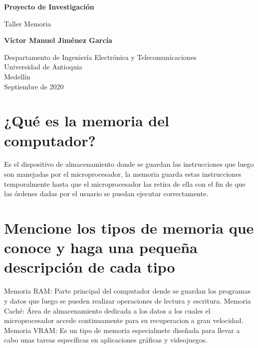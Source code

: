 \documentclass{article}
\begin{document}
\begin{titlepage}
    \begin{center}
        \vspace*{1cm}
            
        \Huge
        \textbf{Proyecto de Investigación}
            
        \vspace{0.5cm}
        \LARGE
        Taller Memoria
            
        \vspace{1.5cm}
            
        \textbf{Víctor Manuel Jiménez García}
            
        \vfill
            
        \vspace{0.8cm}
            
        \Large
        Despartamento de Ingeniería Electrónica y Telecomunicaciones\\
        Universidad de Antioquia\\
        Medellín\\
        Septiembre de 2020
            
    \end{center}
\end{titlepage}

\tableofcontents

\section{¿Qué es la memoria del computador?}
Es el dispositivo de almacenamiento donde se guardan las instrucciones que luego son manejadas por el microprocesador, la memoria guarda estas instrucciones temporalmente hasta que el microprocesador las retira de ella con el fin de que las órdenes dadas por el usuario se puedan ejecutar correctamente.

\section{Mencione los tipos de memoria que conoce y haga una pequeña descripción de cada tipo} \label{contenido}
Memoria RAM: Parte principal del computador dende se guardan los programas y datos que luego se pueden realizar operaciones de lectura y escritura.
Memoria Caché: Área de almacenamiento dedicada a los datos a los cuales el microprocesador accede continuamente para su recuperacion a gran velocidad.
Memoria VRAM: Es un tipo de memoria especialmete diseñada para llevar a cabo unas tareas específicas en aplicaciones gráficas y videojuegos.
\end{document}
